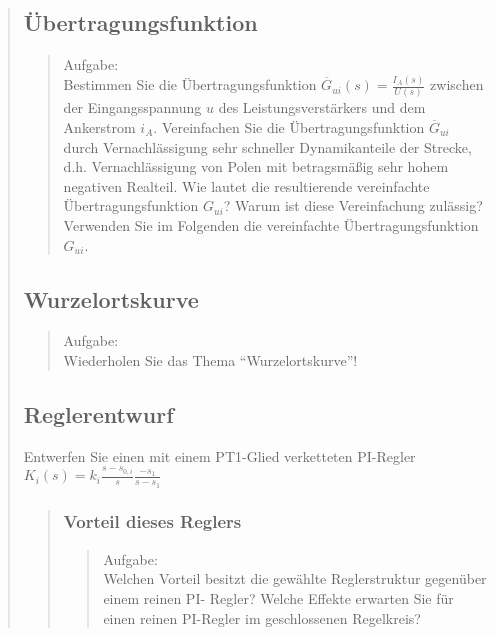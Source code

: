 \begin{quote}
	\subsection{Übertragungsfunktion}
	\begin{quote}
		Aufgabe:\\
		Bestimmen Sie die Übertragungsfunktion $\overline{G}_{ui}(s) = \frac{I_A(s)}{U(s)}$ zwischen der
		Eingangsspannung $u$ des Leistungsverstärkers und dem Ankerstrom $i_A$. Vereinfachen Sie die 
		Übertragungsfunktion $\overline{G}_{ui}$ durch Vernachlässigung sehr schneller Dynamikanteile der Strecke, d.h.
		Vernachlässigung von Polen mit betragsmäßig sehr hohem negativen Realteil. Wie lautet die resultierende
		vereinfachte Übertragungsfunktion $G_{ui}$? Warum ist diese Vereinfachung zulässig? Verwenden Sie im Folgenden
		die vereinfachte Übertragungsfunktion $G_{ui}$.\\
				
        
	\end{quote}
	
	\subsection{Wurzelortskurve}
	\begin{quote}
		Aufgabe:\\
		Wiederholen Sie das Thema "`Wurzelortskurve"'!\\
		

    \end{quote}
    
    \subsection{Reglerentwurf}
    Entwerfen Sie einen mit einem PT1-Glied verketteten PI-Regler $K_i(s) = k_i \frac{s-s_{0,i}}{s} \frac{-s_1}{s-s_1}$
    \begin{quote}
        \subsubsection{Vorteil dieses Reglers}
            
        \begin{quote}
            Aufgabe:\\
            Welchen Vorteil besitzt die gewählte Reglerstruktur gegenüber einem reinen PI-
            Regler? Welche Effekte erwarten Sie für einen reinen PI-Regler im geschlossenen
            Regelkreis?\\
            

\end{quote}
\end{quote}
\end{quote}
